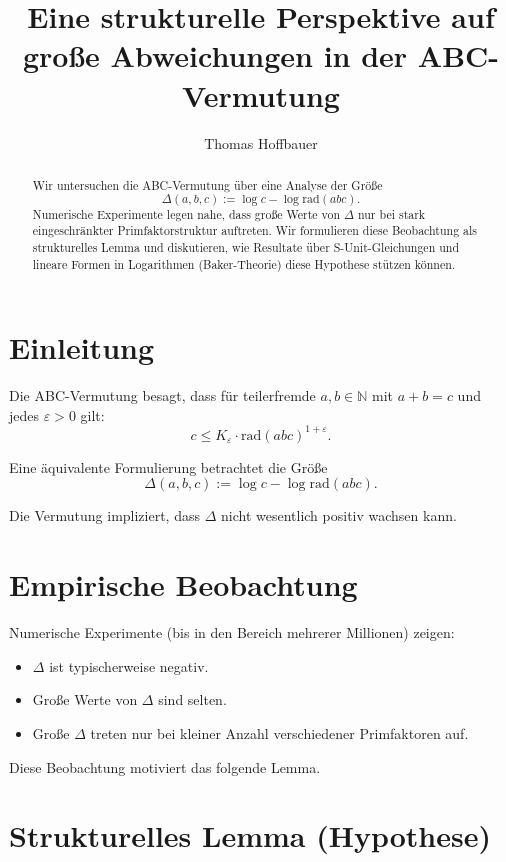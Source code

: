 \documentclass[11pt]{article}
\title{Eine strukturelle Perspektive auf große Abweichungen in der ABC-Vermutung}
\author{Thomas Hoffbauer}
\date{}
\begin{document}
	\maketitle
	
	\begin{abstract}
		Wir untersuchen die ABC-Vermutung über eine Analyse der Größe
		\[
		\Delta(a,b,c) := \log c - \log \mathrm{rad}(abc).
		\]
		Numerische Experimente legen nahe, dass große Werte von $\Delta$
		nur bei stark eingeschränkter Primfaktorstruktur auftreten.
		Wir formulieren diese Beobachtung als strukturelles Lemma und diskutieren,
		wie Resultate über S-Unit-Gleichungen und lineare Formen in Logarithmen
		(Baker-Theorie) diese Hypothese stützen können.
	\end{abstract}
	
	\section{Einleitung}
	
	Die ABC-Vermutung besagt, dass für teilerfremde $a,b \in \mathbb{N}$ mit $a+b=c$
	und jedes $\varepsilon>0$ gilt:
	\[
	c \le K_\varepsilon \cdot \mathrm{rad}(abc)^{1+\varepsilon}.
	\]
	
	Eine äquivalente Formulierung betrachtet die Größe
	\[
	\Delta(a,b,c) := \log c - \log \mathrm{rad}(abc).
	\]
	
	Die Vermutung impliziert, dass $\Delta$ nicht wesentlich positiv wachsen kann.
	
	\section{Empirische Beobachtung}
	
	Numerische Experimente (bis in den Bereich mehrerer Millionen) zeigen:
	\begin{itemize}
		\item $\Delta$ ist typischerweise negativ.
		\item Große Werte von $\Delta$ sind selten.
		\item Große $\Delta$ treten nur bei kleiner Anzahl verschiedener Primfaktoren auf.
	\end{itemize}
	
	Diese Beobachtung motiviert das folgende Lemma.
	
	\section{Strukturelles Lemma (Hypothese)}
	
\end{document}
